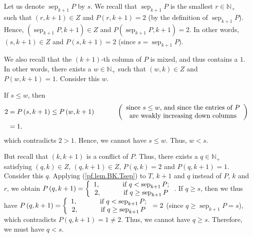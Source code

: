 \documentclass[numbers=enddot,12pt,final,onecolumn,notitlepage]{scrartcl}%
\theoremstyle{definition}
\newenvironment{verlong}{}{}
\begin{document}
\begin{verlong}
\begin{itemize}
{Let us denote $\operatorname*{sep}\nolimits_{k+1}P$ by $s$. We recall that
$\operatorname*{sep}\nolimits_{k+1}P$ is the smallest $r\in\mathbb{N}_{+}$
such that $\left(  r,k+1\right)  \in Z$ and $P\left(  r,k+1\right)  =2$ (by
the definition of $\operatorname*{sep}\nolimits_{k+1}P$). Hence, $\left(
\operatorname*{sep}\nolimits_{k+1}P,k+1\right)  \in Z$ and $P\left(
\operatorname*{sep}\nolimits_{k+1}P,k+1\right)  =2$. In other words, $\left(
s,k+1\right)  \in Z$ and $P\left(  s,k+1\right)  =2$ (since
$s=\operatorname*{sep}\nolimits_{k+1}P$).

We also recall that the $\left(  k+1\right)  $-th column of $P$ is mixed, and
thus contains a $1$. In other words, there exists a $w\in\mathbb{N}_{+}$ such
that $\left(  w,k\right)  \in Z$ and $P\left(  w,k+1\right)  =1$. Consider
this $w$.

If $s\leq w$, then%
\begin{align*}
2 &  =P\left(  s,k+1\right)  \leq P\left(  w,k+1\right)
\ \ \ \ \ \ \ \ \ \ \left(
\begin{array}
[c]{c}%
\text{since }s\leq w\text{, and since the entries of }P\\
\text{are weakly increasing down columns}%
\end{array}
\right)  \\
&  =1,
\end{align*}
which contradicts $2>1$. Hence, we cannot have $s\leq w$. Thus, $w<s$.

But recall that $\left(  k,k+1\right)  $ is a conflict of $P$. Thus, there
exists a $q\in\mathbb{N}_{+}$ satisfying $\left(  q,k\right)  \in Z$, $\left(
q,k+1\right)  \in Z$, $P\left(  q,k\right)  =2$ and $P\left(  q,k+1\right)
=1$. Consider this $q$. Applying (\ref{pf.lem.BK.Tsep}) to $T$, $k+1$ and $q$
instead of $P$, $k$ and $r$, we obtain $P\left(  q,k+1\right)  =\left\{
\begin{array}
[c]{c}%
1,\ \ \ \ \ \ \ \ \ \ \text{if }q<\operatorname*{sep}\nolimits_{k+1}P;\\
2,\ \ \ \ \ \ \ \ \ \ \text{if }q\geq\operatorname*{sep}\nolimits_{k+1}P
\end{array}
\right.  $. If $q\geq s$, then we thus have $P\left(  q,k+1\right)  =\left\{
\begin{array}
[c]{c}%
1,\ \ \ \ \ \ \ \ \ \ \text{if }q<\operatorname*{sep}\nolimits_{k+1}P;\\
2,\ \ \ \ \ \ \ \ \ \ \text{if }q\geq\operatorname*{sep}\nolimits_{k+1}P
\end{array}
\right.  =2$ (since $q\geq\operatorname*{sep}\nolimits_{k+1}P=s$), which
contradicts $P\left(  q,k+1\right)  =1\neq2$. Thus, we cannot have $q\geq s$.
Therefore, we must have $q<s$.

}
\end{itemize}
\end{verlong}
\end{document}
